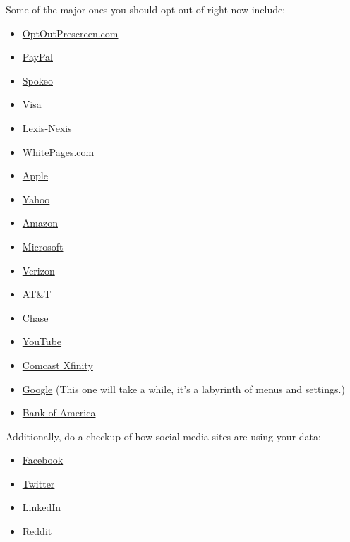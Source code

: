 Some of the major ones you should opt out of right now include:

\begin{itemize}
\item
  \href{https://simpleoptout.com/\#optoutprescreen.com}{OptOutPrescreen.com}
\item
  \href{https://simpleoptout.com/\#paypal}{PayPal}
\item
  \href{https://simpleoptout.com/\#spokeo}{Spokeo}
\item
  \href{https://simpleoptout.com/\#visa}{Visa}
\item
  \href{https://simpleoptout.com/\#lexis-nexis}{Lexis-Nexis}
\item
  \href{https://simpleoptout.com/\#whitepages.com}{WhitePages.com}
\item
  \href{https://simpleoptout.com/\#apple}{Apple}
\item
  \href{https://simpleoptout.com/\#yahoo/oath}{Yahoo}
\item
  \href{https://simpleoptout.com/\#amazon.com}{Amazon}
\item
  \href{https://simpleoptout.com/\#microsoft}{Microsoft}
\item
  \href{https://simpleoptout.com/\#verizon}{Verizon}
\item
  \href{https://simpleoptout.com/\#at\&t}{AT\&T}
\item
  \href{https://simpleoptout.com/\#chase}{Chase}
\item
  \href{https://simpleoptout.com/\#youtube}{YouTube}
\item
  \href{https://simpleoptout.com/\#comcast-xfinity}{Comcast Xfinity}
\item
  \href{https://simpleoptout.com/\#google}{Google} (This one will take a
  while, it's a labyrinth of menus and settings.)
\item
  \href{https://simpleoptout.com/\#bank-of-america}{Bank of America}
\end{itemize}

Additionally, do a checkup of how social media sites are using your
data:

\begin{itemize}
\item
  \href{https://simpleoptout.com/\#facebook}{Facebook}
\item
  \href{https://simpleoptout.com/\#twitter}{Twitter}
\item
  \href{https://simpleoptout.com/\#linkedin}{LinkedIn}
\item
  \href{https://simpleoptout.com/\#reddit}{Reddit}
\end{itemize}

